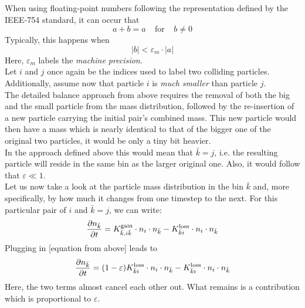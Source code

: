         When using floating-point numbers following the representation defined
        by the IEEE-754 standard, it can occur that
        \begin{equation}
          a+b=a
          \ \ \ \ \ \text{for} \ \ \ \ \
          b\neq0
        \end{equation}
        Typically, this happens when
        \begin{equation}
            |b|<\varepsilon_m\cdot|a|
        \end{equation}
        Here, $\varepsilon_m$ labels the \textit{machine precision}.
        \\
        
        Let $i$ and $j$ once again be the indices used to label two colliding particles. Additionally, 
        assume now that particle $i$ is \textit{much smaller} than particle $j$.\\
        
        The detailed balance approach from above requires the removal of both the big and the small 
        particle from the mass distribution, followed by the re-insertion of a new particle carrying the 
        initial pair's combined mass. This new particle would then have a mass which is nearly identical 
        to that of the bigger one of the original two particles, it would be only a tiny bit heavier.\\
        
        In the approach defined above this would mean that $\bar k=j$, i.e. the resulting particle will 
        reside in the same bin as the larger original one. Also, it would follow that 
        $\varepsilon\ll1$.\\
        
        Let us now take a look at the particle mass distribution in the bin $\bar k$ and, more 
        specifically, by how much it changes from one timestep to the next. For this particular pair of 
        $i$ and $\bar k=j$, we can write:
        \begin{equation}
            \frac{\partial n_{\bar k}}{\partial t}
                =K_{\bar k,i\bar k}^{\text{gain}}\cdot n_i\cdot n_{\bar k}
                -K_{\bar ki}^{\text{loss}}\cdot n_i\cdot n_{\bar k}
        \end{equation}
        Plugging in [equation from above] leads to
        \begin{equation}
            \frac{\partial n_{\bar k}}{\partial t}
                =(1-\varepsilon)K_{\bar ki}^{\text{loss}}\cdot n_i\cdot n_{\bar k}
                -K_{\bar ki}^{\text{loss}}\cdot n_i\cdot n_{\bar k}
        \end{equation}
        Here, the two terms almost cancel each other out. What remains is a contribution which is 
        proportional to $\varepsilon$.\\
        
